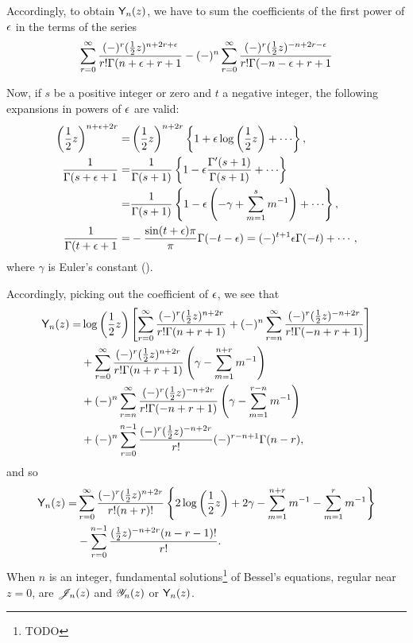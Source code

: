 Accordingly, to obtain $\mathsf{Y}_{n}(z)$, we have to sum the
coefficients of the first power of $\epsilon$ in the terms of the
series
$$
\sum_{r=0}^{\infty}
\frac{(-)^{r} (\frac{1}{2} z)^{n+2r+\epsilon}}{r! \Gamma(n+\epsilon+r+1}
-
(-)^{n}
\sum_{r=0}^{\infty}
\frac{(-)^{r} (\frac{1}{2} z)^{-n+2r -\epsilon}}{r! \Gamma(-n-\epsilon+r+1}
$$

Now, if $s$ be a positive integer or zero and $t$ a negative
integer, the following expansions in powers of $\epsilon$ are valid:
\begin{align*}
  \theparen{\half z}^{n+\eps+2r}
  =& \theparen{\half z}^{n+2r}
  \thebrace{1 + \eps\log\theparen{\half z} + \cdots},
  \\
  \frac{1}{\Gamma(s+\eps+1}
  =&
  \frac{1}{\Gamma(s+1)}
  \thebrace{
    1 - \eps \frac{\Gamma'(s+1)}{\Gamma(s+1)} + \cdots
  }
  \\
  =&
  \frac{1}{\Gamma(s+1)}
  \thebrace{
    1 - \eps\theparen{-\gamma + \sum_{m=1}^{s} m^{-1}} + \cdots
  },
  \\
  \frac{1}{\Gamma(t+\eps+1}
  =&
  - \frac{\sin(t+\eps)\pi}{\pi}
  \Gamma(-t-\eps)
  =
  (-)^{t+1} \eps \Gamma(-t) + \cdots,
\end{align*}
where $\gamma$ is Euler's constant ().

% 
% 
Accordingly, picking out the coefficient of $\epsilon$, we see that
\begin{align*}
  \mathsf{Y}_{n}(z)
  =&
  \log\left( \frac{1}{2} z \right)
  \left[ 
    \sum_{r=0}^{\infty}
    \frac{(-)^{r} (\frac{1}{2} z)^{n+2r}}{r! \Gamma(n+r+1)}
    + (-)^{n} \sum_{r=n}^{\infty} \frac{(-)^{r} (\frac{1}{2} z)^{-n+2r}}{r! \Gamma(-n+r+1)}
   \right]
  \\
  &
  + \sum_{r=0}^{\infty}
  \frac{(-)^{r} (\frac{1}{2} z)^{n+2r}}{r! \Gamma(n+r+1)}
  \left( \gamma - \sum_{m=1}^{n+r} m^{-1} \right)
  \\
  &
  + (-)^{n}
  \sum_{r=n}^{\infty}
  \frac{(-)^{r} (\frac{1}{2} z)^{-n+2r}}{r! \Gamma(-n+r+1)}
  \left( \gamma - \sum_{m=1}^{r-n} m^{-1} \right)
  \\
  &
  + (-)^{n}
  \sum_{r=0}^{n-1}
  \frac{ (-)^{r} (\frac{1}{2} z)^{-n+2r}}{r!}
  (-)^{r-n+1} \Gamma(n-r),
\end{align*}
and so
\begin{align*}
  \mathsf{Y}_{n}(z)
  =&
  \sum_{r=0}^{\infty}
  \frac{(-)^{r} (\frac{1}{2} z)^{n+2r}}{r!(n+r)!}
  \left\{ 
    2 \log\left( \frac{1}{2} z \right)
    + 2\gamma
    - \sum_{m=1}^{n+r} m^{-1}
    - \sum_{m=1}^{r} m^{-1}
   \right\}
  \\
  & - \sum_{r=0}^{n-1} \frac{(\frac{1}{2} z)^{-n+2r} (n-r-1)!}{r!}.
\end{align*}
When $n$ is an integer, fundamental solutions\footnote{TODO} of
Bessel's equations, regular near $z=0$, are $\mathscr{J}_{n}(z)$ and $\mathscr{Y}_{n}(z)$ or
$\mathsf{Y}_{n}(z)$.

